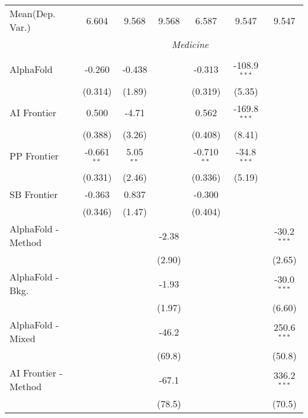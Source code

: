 \begin{tabular}{lcccccc}
Mean(Dep. Var.) & 6.604 & 9.568 & 9.568 & 6.587 & 9.547 & 9.547 \\
 & \multicolumn{6}{c}{\textit{Medicine}} \\ \\
   AlphaFold            & -0.260        & -0.438      &             & -0.313        & -108.9$^{***}$ &   \\   
                        & (0.314)       & (1.89)      &             & (0.319)       & (5.35)         &   \\   
   AI Frontier          & 0.500         & -4.71       &             & 0.562         & -169.8$^{***}$ &   \\   
                        & (0.388)       & (3.26)      &             & (0.408)       & (8.41)         &   \\   
   PP Frontier          & -0.661$^{**}$ & 5.05$^{**}$ &             & -0.710$^{**}$ & -34.8$^{***}$  &   \\   
                        & (0.331)       & (2.46)      &             & (0.336)       & (5.19)         &   \\   
   SB Frontier          & -0.363        & 0.837       &             & -0.300        &                &   \\   
                        & (0.346)       & (1.47)      &             & (0.404)       &                &   \\   
   AlphaFold - Method   &               &             & -2.38       &               &                & -30.2$^{***}$\\   
                        &               &             & (2.90)      &               &                & (2.65)\\   
   AlphaFold - Bkg.     &               &             & -1.93       &               &                & -30.0$^{***}$\\   
                        &               &             & (1.97)      &               &                & (6.60)\\   
   AlphaFold - Mixed    &               &             & -46.2       &               &                & 250.6$^{***}$\\   
                        &               &             & (69.8)      &               &                & (50.8)\\   
   AI Frontier - Method &               &             & -67.1       &               &                & 336.2$^{***}$\\   
                        &               &             & (78.5)      &               &                & (70.5)\\   

\end{tabular}
